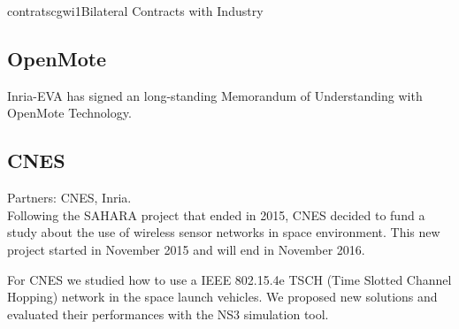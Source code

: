 \documentclass{ra2016}
\begin{document}
\begin{module}{contrats}{cgwi1}{Bilateral Contracts with Industry}

\subsection{OpenMote}

\begin{participants}
\end{participants}

Inria-EVA has signed an long-standing Memorandum of Understanding with OpenMote Technology.

\subsection{CNES}

\begin{participants}
\end{participants}

Partners: CNES, Inria.\\

Following the SAHARA project that ended in 2015, CNES decided to fund a study about the use of wireless sensor networks in space environment.
This new project started in November 2015 and will end in November 2016.

For CNES we studied how to use a IEEE 802.15.4e TSCH (Time Slotted Channel Hopping) network in the space launch vehicles. We proposed new solutions and evaluated their performances with the NS3 simulation tool.\\

\end{module}
\end{document}
